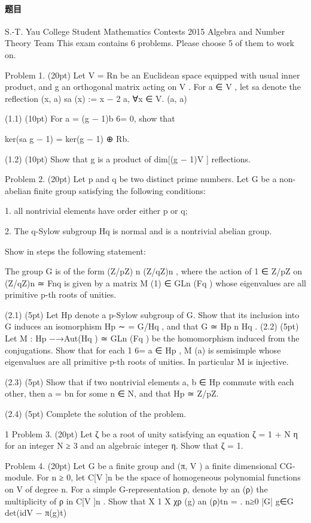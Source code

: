 \documentclass[UTF8,12pt]{ctexart}
\begin{document}
\paragraph{题目}
S.-T. Yau College Student Mathematics Contests 2015 Algebra and Number Theory Team This exam contains 6 problems. Please choose 5 of them to work on.

Problem 1. (20pt) Let V = Rn be an Euclidean space equipped with usual inner product, and g an orthogonal matrix acting on V . For a ∈ V , let sa denote the reflection (x, a) sa (x) := x − 2 a, ∀x ∈ V. (a, a)

(1.1) (10pt) For a = (g − 1)b 6= 0, show that

ker(sa g − 1) = ker(g − 1) ⊕ Rb.

(1.2) (10pt) Show that g is a product of dim[(g − 1)V ] reflections.

Problem 2. (20pt) Let p and q be two distinct prime numbers. Let G be a non-abelian finite group satisfying the following conditions:

1. all nontrivial elements have order either p or q;

2. The q-Sylow subgroup Hq is normal and is a nontrivial abelian group.

Show in steps the following statement:

The group G is of the form (Z/pZ) n (Z/qZ)n , where the action of 1 ∈ Z/pZ on (Z/qZ)n ≃ Fnq is given by a matrix M (1) ∈ GLn (Fq ) whose eigenvalues are all primitive p-th roots of unities.

(2.1) (5pt) Let Hp denote a p-Sylow subgroup of G. Show that its inclusion into G induces an isomorphism Hp ∼ = G/Hq , and that G ≃ Hp n Hq . (2.2) (5pt) Let M : Hp −→Aut(Hq ) ≃ GLn (Fq ) be the homomorphism induced from the conjugations. Show that for each 1 6= a ∈ Hp , M (a) is semisimple whose eigenvalues are all primitive p-th roots of unities. In particular M is injective.

(2.3) (5pt) Show that if two nontrivial elements a, b ∈ Hp commute with each other, then a = bn for some n ∈ N, and that Hp ≃ Z/pZ.

(2.4) (5pt) Complete the solution of the problem.

1 Problem 3. (20pt) Let ζ be a root of unity satisfying an equation ζ = 1 + N η for an integer N ≥ 3 and an algebraic integer η. Show that ζ = 1.

Problem 4. (20pt) Let G be a finite group and (π, V ) a finite dimensional CG-module. For n ≥ 0, let C[V ]n be the space of homogeneous polynomial functions on V of degree n. For a simple G-representation ρ, denote by an (ρ) the multiplicity of ρ in C[V ]n . Show that X 1 X χρ (g) an (ρ)tn = . n≥0 |G| g∈G det(idV − π(g)t)
\end{document}
